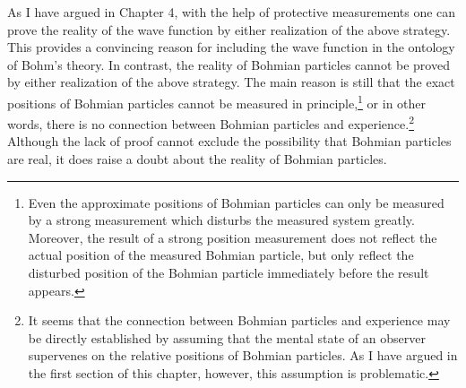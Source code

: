 As I have argued in Chapter 4, with the help of protective measurements one can prove the reality of the wave function by either realization of the above strategy. 
This provides a convincing reason for including the wave function in the ontology of Bohm's theory. In contrast,  the reality of Bohmian particles cannot be proved by either realization of the above strategy.
The main reason is still that the exact positions of Bohmian particles cannot be measured in principle,\footnote{Even the approximate positions of Bohmian particles can only be measured by a strong measurement which disturbs the measured system greatly. Moreover, the result of a strong position measurement does not reflect the actual position of the measured Bohmian particle, but only reflect the disturbed position of the Bohmian particle immediately before the result appears.}
 or in other words, there is no connection between Bohmian particles and experience.\footnote{It seems that the connection between Bohmian particles and experience may be directly established by assuming that the mental state of an observer supervenes on the relative positions of Bohmian particles. As I have argued in the first section of this chapter, however, this assumption is problematic.}
Although the lack of proof cannot exclude the possibility that Bohmian particles are real, it does raise a doubt about the reality of Bohmian particles.

